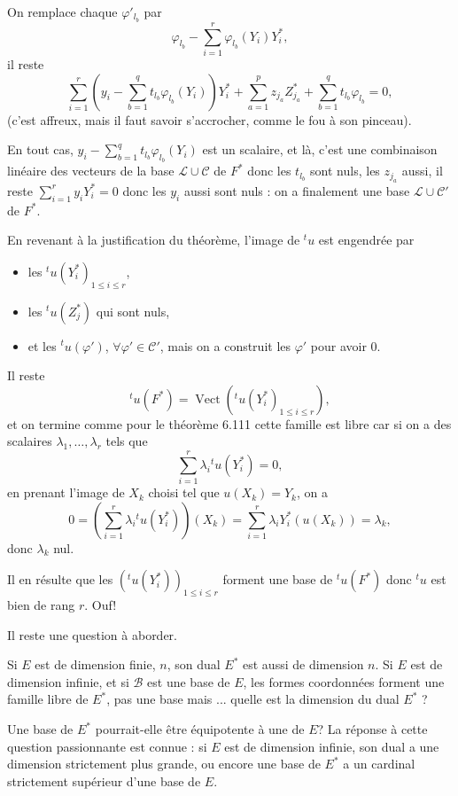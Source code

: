 On remplace chaque $\varphi'_{l_b}$ par
\[
\varphi_{l_b}-\sum_{i=1}^r\varphi_{l_b}(Y_i)Y_i^*,
\]
il reste
\[
\sum_{i=1}^r\left(y_i-\sum_{b=1}^q t_{l_b}\varphi_{l_b}(Y_i)\right)Y_i^*
+\sum_{a=1}^p z_{j_a}Z_{j_a}^*
+\sum_{b=1}^q t_{l_b}\varphi_{l_b}=0,
\]
(c'est affreux, mais il faut savoir s'accrocher, comme le fou à son pinceau).

En tout cas, $y_i-\sum_{b=1}^q t_{l_b}\varphi_{l_b}(Y_i)$ est un scalaire, et là, c'est une combinaison linéaire des vecteurs de la base $\mathcal L\cup\mathcal C$ de $F^*$ donc les $t_{l_b}$ sont nuls, les $z_{j_a}$ aussi, il reste $\sum_{i=1}^r y_iY_i^*=0$ donc les $y_i$ aussi sont nuls : on a finalement une base $\mathcal L\cup\mathcal C'$ de $F^*$.

En revenant à la justification du théorème, l'image de ${}^tu$ est engendrée par
\begin{itemize}[leftmargin=2em]
\item les ${}^tu(Y_i^*)_{1\le i\le r}$,
\item les ${}^tu(Z_j^*)$ qui sont nuls,
\item et les ${}^tu(\varphi')$, $\forall\varphi'\in\mathcal C'$, mais on a construit les $\varphi'$ pour avoir 0.
\end{itemize}
Il reste
\[
{}^tu(F^*)=\operatorname{Vect}({}^tu(Y_i^*)_{1\le i\le r}),
\]
et on termine comme pour le théorème 6.111 cette famille est libre car si on a des scalaires $\lambda_1,\ldots,\lambda_r$ tels que
\[
\sum_{i=1}^r\lambda_i{}^tu(Y_i^*)=0,
\]
en prenant l'image de $X_k$ choisi tel que $u(X_k)=Y_k$, on a
\[
0=\left(\sum_{i=1}^r\lambda_i{}^tu(Y_i^*)\right)(X_k)
=\sum_{i=1}^r\lambda_iY_i^*(u(X_k))=\lambda_k,
\]
donc $\lambda_k$ nul.

Il en résulte que les $({}^tu(Y_i^*))_{1\le i\le r}$ forment une base de ${}^tu(F^*)$ donc ${}^tu$ est bien de rang $r$. Ouf! \bookend

Il reste une question à aborder.

Si $E$ est de dimension finie, $n$, son dual $E^*$ est aussi de dimension $n$. Si $E$ est de dimension infinie, et si $\mathcal B$ est une base de $E$, les formes coordonnées forment une famille libre de $E^*$, pas une base mais ... quelle est la dimension du dual $E^*$ ?

Une base de $E^*$ pourrait-elle être équipotente à une de $E$? La réponse à cette question passionnante est connue : si $E$ est de dimension infinie, son dual a une dimension strictement plus grande, ou encore une base de $E^*$ a un cardinal strictement supérieur  d'une base de $E$.

